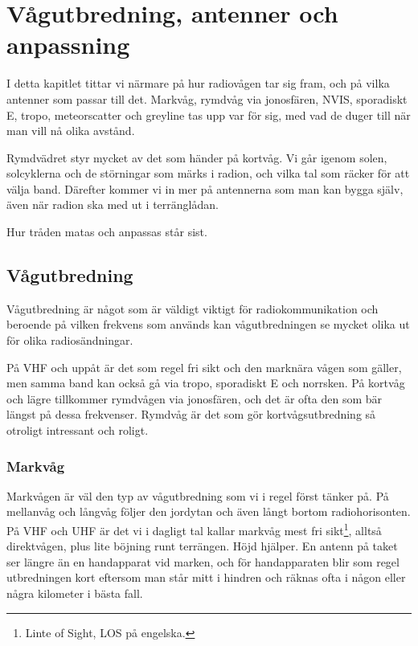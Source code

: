 \chapter{Vågutbredning, antenner och anpassning}

I detta kapitlet tittar vi närmare på hur radiovågen tar sig fram, och
på vilka antenner som passar till det. Markvåg, rymdvåg via
jonosfären, NVIS, sporadiskt E, tropo, meteorscatter och greyline tas
upp var för sig, med vad de duger till när man vill nå olika avstånd.

Rymdvädret styr mycket av det som händer på kortvåg. Vi går igenom
solen, solcyklerna och de störningar som märks i radion, och vilka tal
som räcker för att välja band. Därefter kommer vi in mer på antennerna
som man kan bygga själv, även när radion ska med ut i
terränglådan.

Hur tråden matas och anpassas står sist.

\vfill

\minitoc

\clearpage


\label{vågutbredning}

\section{Vågutbredning}

Vågutbredning är något som är väldigt viktigt för radiokommunikation
och beroende på vilken frekvens som används kan vågutbredningen se
mycket olika ut för olika radiosändningar.

På VHF och uppåt är det som regel fri sikt och den marknära vågen som
gäller, men samma band kan också gå via tropo, sporadiskt E och
norrsken. På kortvåg och lägre tillkommer rymdvågen via jonosfären,
och det är ofta den som bär längst på dessa frekvenser. Rymdvåg är det
som gör kortvågsutbredning så otroligt intressant och roligt.

\subsection{Markvåg}
\label{sec:markvag}

Markvågen är väl den typ av vågutbredning som vi i regel först tänker
på. På mellanvåg och långvåg följer den jordytan och även långt bortom
radiohorisonten. På VHF och UHF är det vi i dagligt tal kallar markvåg
mest fri sikt\footnote{Linte of Sight, LOS på engelska.}, alltså
direktvågen, plus lite böjning runt terrängen. Höjd hjälper. En antenn
på taket ser längre än en handapparat vid marken, och för
handapparaten blir som regel utbredningen kort eftersom man står mitt
i hindren och räknas ofta i någon eller några kilometer i bästa fall.

